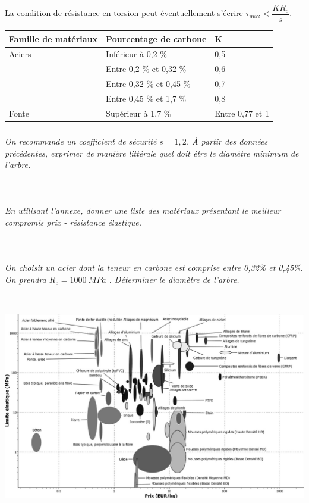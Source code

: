 \documentclass[10pt,fleqn]{article} %
\begin{document}
\begin{multicols}{2}
La condition de résistance en torsion peut éventuellement s'écrire $\tau_{\text{max}}< \dfrac{K R_e}{ s}$.

\begin{center}
\begin{tabular}{p{2cm}lp{1.5cm}}
\hline
Famille de matériaux & Pourcentage de carbone & K \\ \hline \hline
Aciers & Inférieur à 0,2 \%	&0,5 \\ \hline
&Entre 0,2 \% et 0,32 \%	&0,6 \\ \hline
&Entre 0,32 \% et 0,45 \%	&0,7 \\ \hline
&Entre 0,45 \% et 1,7 \%	&0,8 \\ \hline
Fonte&Supérieur à 1,7 \%	&Entre 0,77 et 1 \\ \hline
\end{tabular}
\end{center}


\subparagraph{}\textit{On recommande un coefficient de sécurité $s=1,2$. À partir des données précédentes, exprimer de manière littérale quel doit être le diamètre minimum de l’arbre.}
\ifprof
\begin{corrige}~\\
\end{corrige}
\else
\fi

\subparagraph{}\textit{En utilisant l’annexe, donner une liste des matériaux présentant le meilleur compromis prix - résistance élastique.}%
\ifprof
\begin{corrige}~\\
\end{corrige}
\else
\fi

\subparagraph{}\textit{On choisit un acier dont la teneur en carbone est comprise entre 0,32\% et 0,45\%. On prendra $R_e=\SI{1 000}{MPa}$ . Déterminer le diamètre de l’arbre.}
\ifprof
\begin{corrige}~\\
\end{corrige}
\else
\fi

\end{multicols}


\begin{center}
\includegraphics[width=\linewidth]{images/fig_06}
\end{center}
\end{document}
